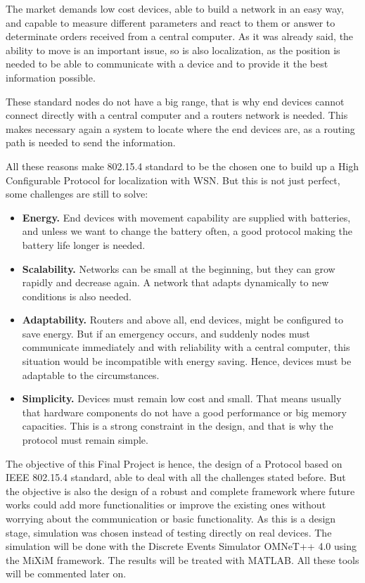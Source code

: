 The market demands low cost devices, able to build a network in an easy way, and capable to measure different parameters and react to them
or answer to determinate orders received from a central computer. As it was already said, the ability to move is an important issue, so is 
also localization, as the position is needed to be able to communicate with a device and to provide it the best information possible.

These standard nodes do not have a big range, that is why end devices cannot connect directly with a central computer and a routers network 
is needed. This makes necessary again a system to locate where the end devices are, as a routing path is needed to send the information.

All these reasons make 802.15.4 standard to be the chosen one to build up a High Configurable Protocol for localization with \ac{WSN}. 
But this is not just perfect, some challenges are still to solve:

\begin{itemize}
 \item \textbf{Energy.} End devices with movement capability are supplied with batteries, and unless we want to change the battery often,
a good protocol making the battery life longer is needed.
 \item \textbf{Scalability.} Networks can be small at the beginning, but they can grow rapidly and decrease again. A network that adapts 
dynamically to new conditions is also needed.
 \item \textbf{Adaptability.} Routers and above all, end devices, might be configured to save energy. But if an emergency occurs, and suddenly
nodes must communicate immediately and with reliability with a central computer, this situation would be incompatible with energy saving. 
Hence, devices must be adaptable to the circumstances.
 \item \textbf{Simplicity.} Devices must remain low cost and small. That means usually that hardware components do not have a good performance
or big memory capacities. This is a strong constraint in the design, and that is why the protocol must remain simple.
\end{itemize}

The objective of this Final Project is hence, the design of a Protocol based on \ac{IEEE} 802.15.4 standard, able to deal with all the 
challenges stated before. But the objective is also the design of a robust and complete framework where future works could add more 
functionalities or improve the existing ones without worrying about the communication or basic functionality.
As this is a design stage, simulation was chosen instead of testing directly on real devices. The simulation will be done with the Discrete 
Events Simulator \ac{OMNeT++} 4.0 using the \ac{MiXiM} framework. The results will be treated with \ac{MATLAB}. All these tools will be 
commented later on.

